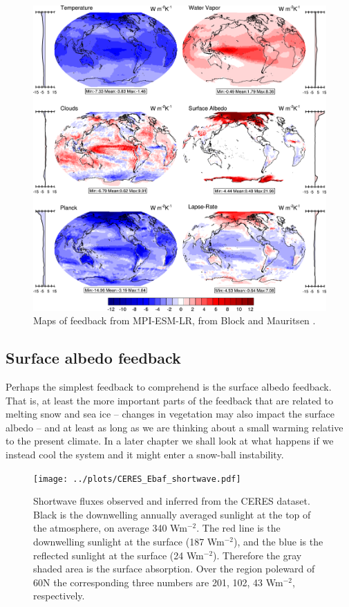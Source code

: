 \documentclass[12pt]{book}
\begin{document}
\begin{figure}
\begin{center}
\includegraphics[width=15 cm]{../external_figures/MPI-ESM_abrupt4xCO2_allfeedbacks_contour.png}
\end{center}
\caption{ Maps of feedback from MPI-ESM-LR, from Block and Mauritsen \cite{Block2013}. } 
\label{fig:feedback_maps}
\end{figure}

\subsection{Surface albedo feedback}
Perhaps the simplest feedback to comprehend is the surface albedo feedback. That is, at least the more important parts of the feedback that are related to melting snow and sea ice -- changes in vegetation may also impact the surface albedo -- and at least as long as we are thinking about a small warming relative to the present climate. In a later chapter we shall look at what happens if we instead cool the system and it might enter a snow-ball instability. 

\begin{figure}
\begin{center}
\texttt{[image: ../plots/CERES\_Ebaf\_shortwave.pdf]}
\end{center}
\caption{ Shortwave fluxes observed and inferred from the CERES dataset. Black is the downwelling annually averaged sunlight at the top of the atmosphere, on average 340 Wm$^{-2}$. The red line is the downwelling sunlight at the surface (187 Wm$^{-2}$), and the blue is the reflected sunlight at the surface (24 Wm$^{-2}$). Therefore the gray shaded area is the surface absorption. Over the region poleward of 60N the corresponding three numbers are 201, 102, 43 Wm$^{-2}$, respectively. } 
\label{fig:CERES_shortwave}
\end{figure}
\end{document}
